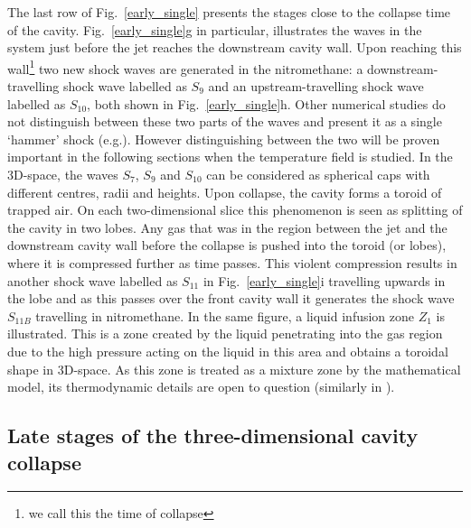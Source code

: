 \documentclass[3p,times,twocolumn]{elsarticle}
\begin{document}
The last row of Fig.\  \ref{early_single} presents the stages close to the collapse time of the cavity. Fig.\  \ref{early_single}g in particular, illustrates the
waves in the system just before the jet reaches the downstream cavity wall.
Upon reaching this wall\footnote{we call this the time of collapse}
two new shock waves are generated in the nitromethane: a downstream-travelling shock wave labelled as $S_9$ and an upstream-travelling shock wave labelled as $S_{10}$, both shown in Fig.\  \ref{early_single}h. Other numerical studies do not distinguish between these two parts of the waves and present it as a single `hammer' shock (e.g.\cite{bourne2002cavity}). However distinguishing between the two will be proven important in the following sections when the temperature field is studied. In the 3D-space, the waves $S_7$, $S_9$ and $S_{10}$ can be considered as spherical caps with different centres, radii and heights. 
Upon collapse, the cavity forms a toroid of trapped air. On each two-dimensional slice this phenomenon is seen as splitting of the cavity in two lobes. Any gas that was in the region between the jet and the downstream cavity wall before the collapse is pushed into the toroid (or lobes), where it is compressed further as time passes. This violent compression results in another shock wave  labelled as $S_{11}$ in Fig.\  \ref{early_single}i travelling upwards in the lobe \cite{ozlem2010numerical} and as this passes over the front cavity wall it generates the shock wave  $S_{11B}$ travelling in nitromethane. 
In the same figure, a liquid infusion zone $Z_1$ is illustrated. This is a zone created by the liquid penetrating into the gas region due to the high pressure acting on the liquid in this area and obtains a toroidal shape in 3D-space. As this zone is treated as a mixture zone by the mathematical model, its thermodynamic details are open to question (similarly in \cite{ozlem2010numerical}).

\subsection{Late stages of the three-dimensional cavity collapse}
\label{3dlate}
\end{document}
